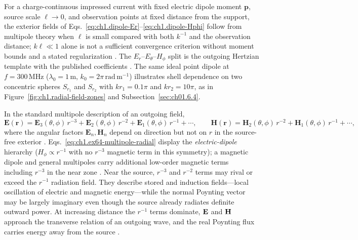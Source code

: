 For a charge-continuous impressed current with fixed electric dipole moment $\mathbf{p}$, source scale $\ell\to 0$, and observation points at fixed distance from the support, the exterior fields of Eqs.~\eqref{eq:ch1.dipole-Er}--\eqref{eq:ch1.dipole-Hphi} follow from multipole theory when $\ell$ is small compared with both $k^{-1}$ and the observation distance; $k\ell\ll 1$ alone is not a sufficient convergence criterion without moment bounds and a stated regularization \cite{stratton1941,harrington2001,jackson1999,yaghjian1982}. The $E_r$--$E_\theta$--$H_\phi$ split is the outgoing Hertzian template with the published coefficients \cite{stratton1941,harrington2001}. The same ideal point dipole at $f=300\,\mathrm{MHz}$ ($\lambda_0=1\,\mathrm{m}$, $k_0=2\pi\,\mathrm{rad\,m^{-1}}$) illustrates shell dependence on two concentric spheres $S_{r_1}$ and $S_{r_2}$ with $kr_1=0.1\pi$ and $kr_2=10\pi$, as in Figure~\ref{fig:ch1.radial-field-zones} and Subsection~\ref{sec:ch01.6.4}.

In the standard multipole description of an outgoing field,
\begin{equation}
\label{eq:ch1.ex64-multipole-radial}
\mathbf{E}(\mathbf{r})=\mathbf{E}_3(\theta,\phi)\,r^{-3}+\mathbf{E}_2(\theta,\phi)\,r^{-2}+\mathbf{E}_1(\theta,\phi)\,r^{-1}+\cdots,
\qquad
\mathbf{H}(\mathbf{r})=\mathbf{H}_2(\theta,\phi)\,r^{-2}+\mathbf{H}_1(\theta,\phi)\,r^{-1}+\cdots,
\end{equation}
where the angular factors $\mathbf{E}_n,\mathbf{H}_n$ depend on direction but not on $r$ in the source-free exterior \cite{stratton1941}. Eqs.~\eqref{eq:ch1.ex64-multipole-radial} display the \emph{electric-dipole} hierarchy (\(H_\phi\propto r^{-1}\) with no \(r^{-3}\) magnetic term in this symmetry); a magnetic dipole and general multipoles carry additional low-order magnetic terms including \(r^{-3}\) in the near zone \cite{jackson1999,stratton1941}. Near the source, $r^{-3}$ and $r^{-2}$ terms may rival or exceed the $r^{-1}$ radiation field. They describe stored and induction fields—local oscillation of electric and magnetic energy—while the normal Poynting vector may be largely imaginary even though the source already radiates definite outward power. At increasing distance the $r^{-1}$ terms dominate, $\mathbf{E}$ and $\mathbf{H}$ approach the transverse relation of an outgoing wave, and the real Poynting flux carries energy away from the source \cite{poynting1884}.

